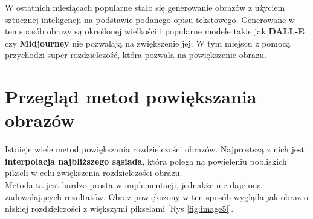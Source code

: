 W ostatnich miesiącach popularne stało się generowanie obrazów z użyciem sztucznej inteligencji na podstawie podanego opisu tekstowego. Generowane w ten sposób obrazy są określonej wielkości i popularne modele takie jak \textbf{DALL-E} czy \textbf{Midjourney} nie pozwalają na zwiększenie jej. W tym miejscu z pomocą przychodzi super-rozdzielczość, która pozwala na powiększenie obrazu.


\section{Przegląd metod powiększania obrazów}


Istnieje wiele metod powiększania rozdzielczości obrazów. Najprostszą z nich jest \textbf{interpolacja najbliższego sąsiada}, która polega na powieleniu pobliskich pikseli w celu zwiększenia rozdzielczości obrazu. \\
Metoda ta jest bardzo prosta w implementacji, jednakże nie daje ona zadowalających rezultatów. Obraz powiększony w ten sposób wygląda jak obraz o niskiej rozdzielczości z większymi pikselami [Rys \ref{fig:image5}]. 

